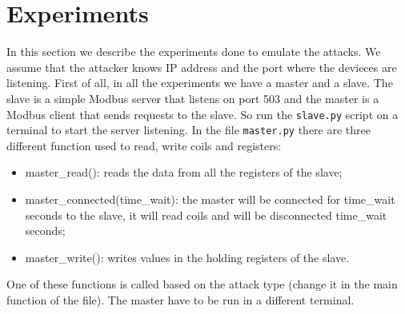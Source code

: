 \documentclass[12pt]{article}
\begin{document}
\section{Experiments}
In this section we describe the experiments done to emulate the attacks. We assume that the attacker knows IP address and the port where the devieces are listening. 
First of all, in all the experiments we have a master and a slave. The slave is a simple Modbus server that listens on port 503 and the master is a Modbus client that sends requests to the slave. So run the \texttt{slave.py} script on a terminal to start the server listening. In the file 
\texttt{master.py} there are three different function used to read, write coils and registers:
\begin{itemize}
    \item master\_read(): reads the data from all the registers of the slave;
    \item master\_connected(time\_wait): the master will be connected for 
    time\_wait seconds to the slave, it will read coils and will be disconnected time\_wait seconds;
    \item master\_write(): writes values in the holding registers of the slave.
\end{itemize}
One of these functions is called based on the attack type (change it in the main function of the file).
The master have to be run in a different terminal.
\end{document}
